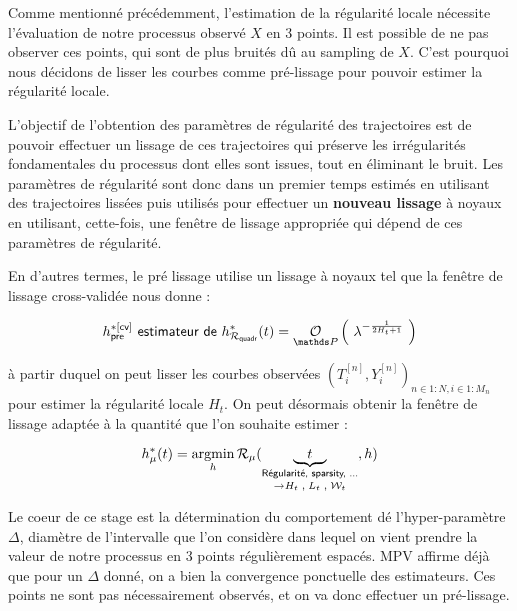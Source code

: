 
Comme mentionné précédemment, l'estimation de la régularité locale nécessite l'évaluation de notre processus observé $X$ en 3 points. Il est possible de ne pas observer ces points, qui sont de plus bruités dû au sampling de $X$. C'est pourquoi nous décidons de lisser les courbes comme \og pré-lissage \fg pour pouvoir estimer la régularité locale.


L'objectif de l'obtention des paramètres de régularité des trajectoires est de pouvoir effectuer un lissage de ces trajectoires qui préserve les irrégularités fondamentales du processus dont elles sont issues, tout en éliminant le bruit. Les paramètres de régularité sont donc dans un premier temps estimés en utilisant des trajectoires lissées puis utilisés pour effectuer un \textbf{nouveau lissage} à noyaux en utilisant, cette-fois, une fenêtre de lissage appropriée qui dépend de ces paramètres de régularité.

En d'autres termes, le pré lissage utilise un lissage à noyaux tel que la fenêtre de lissage cross-validée nous donne :


\begin{equation*}
	h^{*[\textsf{cv}]}_{\textsf{pre}} \textsf{ estimateur de } h^*_{\mathcal R_{\textsf{quadr}}}(t) = \grandop{ \lambda^{- \frac 1 {2  H_t + 1}}} \label{eq:h_cross_noyau_pre}
\end{equation*}

à partir duquel on peut lisser les courbes observées $( T_i^{[n]}, Y_i^{[n]} )_{n \in 1:N, i \in 1:M_n}$ pour estimer la régularité locale $H_t$. On peut désormais obtenir la fenêtre de lissage adaptée à la quantité que l'on souhaite estimer :

\begin{equation*}
	h_\mu^*(t) = \argmin\limits_h \mathcal R_\mu(\underset {\rightarrow H_t \;, \; L_t \; , \; \mathcal W_t}{\underbrace{\quad t \quad}_{\textsf{Régularité, sparsity, ...}}}, h)
\end{equation*}



\bigskip

Le coeur de ce stage est la détermination du comportement dé l'hyper-paramètre $\Delta$, diamètre de l'intervalle que l'on considère dans lequel on vient prendre la valeur de notre processus en 3 points régulièrement espacés. MPV affirme déjà que pour un $\Delta$ donné, on a bien la convergence ponctuelle des estimateurs. Ces points ne sont pas nécessairement observés, et on va donc effectuer un pré-lissage. \cite{maissoro-SmoothnessFTSweakDep}

